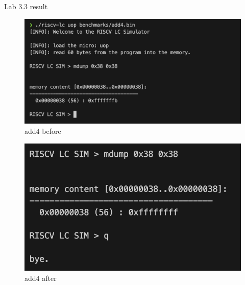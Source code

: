 \documentclass[12pt, a4paper]{article}
\begin{document}
\begin{qNoMark}
Lab 3.3 result
\end{qNoMark}

\begin{ans}
    \begin{figure}[H]
        \caption{add4 before}
        \includegraphics[width=1\linewidth]{../figs/add4-before-1.png}
    \end{figure}
    \begin{figure}[H]
        \caption{add4 after}
        \includegraphics[width=1\linewidth]{../figs/add4-after-1.png}
    \end{figure}
    

\end{ans}
\end{document}
